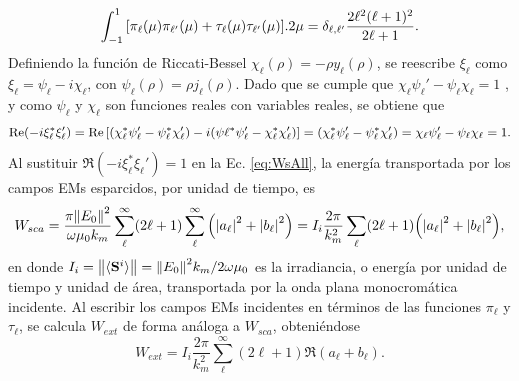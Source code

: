 %
	\begin{equation*}
	 \int_{-1}^{1}\qty[\pi_\ell(\mu)\pi_{\ell'}(\mu) + \tau_\ell(\mu)\tau_{\ell'}(\mu)].2\mu
 			= \delta_{\ell,\ell'} \frac{2\ell^2(\ell+1)^2}{2\ell+1}.
	 \end{equation*} 
%
Definiendo la función de Riccati-Bessel $\chi_\ell (\rho) = -\rho y_\ell(\rho)$, se reescribe $\xi_\ell$ como $\xi_\ell= \psi_\ell-i\chi_\ell$, con $\psi_\ell(\rho) = \rho j_\ell(\rho)$. Dado que se cumple que $\chi_\ell\psi_\ell'-\psi_\ell\chi_\ell = 1$ \cite{bohren1998absorption}, y como $\psi_\ell$ y $\chi_\ell$ son funciones reales con variables reales, se obtiene que 
%
\begin{equation*}
\Re(-i\xi_\ell^*\xi_\ell')=\Re\qty[(\chi_\ell^*\psi_\ell'-\psi_\ell^*\chi_\ell')
						-i(\psi\ell^*\psi_\ell'-\chi_\ell^*\chi_\ell') ] 
						= (\chi_\ell^*\psi_\ell'-\psi_\ell^*\chi_\ell') 
						= \chi_\ell\psi_\ell'-\psi_\ell\chi_\ell = 1.
\end{equation*}
%
Al sustituir $\Re(-i\xi_\ell^*\xi_\ell') = 1$ en la Ec. \eqref{eq:WsAll}, la energía transportada por los campos EMs esparcidos, por unidad de tiempo, es
%
\begin{equation}
W_{sca} = \frac{\pi\norm{E_0}^2}{\omega\mu_0 k_m}
		\sum_\ell^\infty (2\ell+1) \sum_\ell^\infty\qty(\abs{a_\ell}^2+\abs{b_\ell}^2) = I_i \frac{2\pi}{k_m^2}  \sum_\ell (2\ell+1) \qty(\abs{a_\ell}^2+\abs{b_\ell}^2),
\end{equation}
%
en donde $I_i = \norm{\langle\vb{S}^i\rangle} = \norm{E_0}^2k_m/2\omega\mu_0$ es la irradiancia, o energía por unidad de tiempo y unidad de área, transportada por la onda plana monocromática incidente. Al escribir los campos EMs incidentes en términos de las funciones $\pi_\ell$ y $\tau_\ell$, se calcula $W_{ext}$ de forma análoga a $W_{sca}$, obteniéndose
%
\begin{equation}
W_{ext} = I_i \frac{2\pi}{k_m^2}  \sum_\ell^\infty (2\ell+1) \Re(a_\ell + b_\ell).
\end{equation}
%

